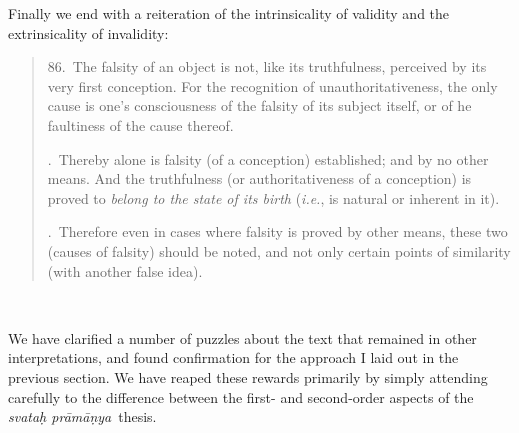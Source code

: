 \documentclass[11pt,letterpaper,oneside]{amsart}
\newcommand{\e}{\emph}
\newenvironment{squote}{\begin{quote}\sf\small}{\rm\end{quote}} %
\newcommand{\svapra}{\e{svata\d{h} pr\={a}m\={a}\d{n}ya}}
\begin{document}
Finally we end with a reiteration of the intrinsicality of validity and the extrinsicality of invalidity:\begin{squote}86.\ The falsity of an object is not, like its truthfulness, perceived by its very first conception. For the recognition of unauthoritativeness, the only cause is one's consciousness of the falsity of its subject itself, or of he faultiness of the cause thereof.

.\ Thereby alone is falsity (of a conception) established; and by no other means. And the truthfulness (or authoritativeness of a conception) is proved to \emph{belong to the state of its birth} (\emph{i.e.}, is natural or inherent in it).

.\ Therefore even in cases where falsity is proved by other means, these two (causes of falsity) should be noted, and not only certain points of similarity (with another false idea).\end{squote}

\


We have clarified a number of puzzles about the text that remained in other interpretations, and found confirmation for the approach I laid out in the previous section. We have reaped these rewards primarily by simply attending carefully to the difference between the first- and second-order aspects of the \svapra\ thesis.













\end{document}
